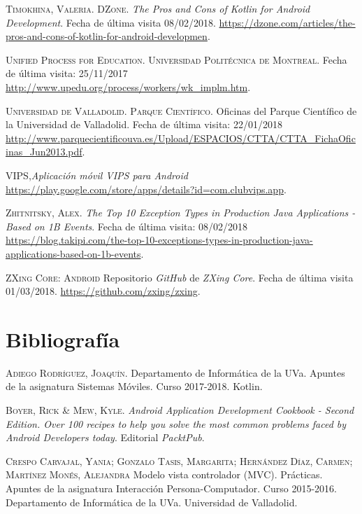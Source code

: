 \documentclass[twoside]{report}
\begin{document}
\begin{thebibliography}{a}
 \textsc{Timokhina, Valeria. DZone}. \textit{The Pros and Cons of Kotlin for Android Development}. Fecha de última visita 08/02/2018. \url{https://dzone.com/articles/the-pros-and-cons-of-kotlin-for-android-developmen}.

 \textsc{Unified Process for Education. Universidad Politécnica de Montreal}. Fecha de última visita: 25/11/2017 \url{http://www.upedu.org/process/workers/wk_implm.htm}.

 \textsc{Universidad de Valladolid. Parque Científico}. Oficinas del Parque Científico de la Universidad de Valladolid. Fecha de última visita: 22/01/2018 \url{http://www.parquecientificouva.es/Upload/ESPACIOS/CTTA/CTTA_FichaOficinas_Jun2013.pdf}.

 \textsc{VIPS},\textit{Aplicación móvil VIPS para Android} \url{https://play.google.com/store/apps/details?id=com.clubvips.app}.

 \textsc{Zhitnitsky, Alex}. \textit{The Top 10 Exception Types in Production Java Applications - Based on 1B Events}. Fecha de última visita: 08/02/2018 \url{https://blog.takipi.com/the-top-10-exceptions-types-in-production-java-applications-based-on-1b-events}.

 \textsc{ZXing Core: Android} 
Repositorio \textit{GitHub} de \textit{ZXing Core}. Fecha de última visita 01/03/2018. \url{https://github.com/zxing/zxing}.

\clearpage

\section{Bibliografía}

 \textsc{Adiego Rodríguez, Joaquín}. Departamento de Informática de la UVa. Apuntes de la asignatura Sistemas Móviles. Curso 2017-2018. Kotlin.

 \textsc{Boyer, Rick \& Mew, Kyle}. \textit{Android Application Development Cookbook - Second Edition. Over 100 recipes to help you solve the most common problems faced by Android Developers today}. Editorial \textit{PacktPub}.

 \textsc{Crespo Carvajal, Yania; Gonzalo Tasis, Margarita; Hernández Díaz, Carmen; Martínez Monés, Alejandra} Modelo vista controlador (MVC). Prácticas. Apuntes de la asignatura Interacción Persona-Computador. Curso 2015-2016. Departamento de Informática de la UVa. Universidad de Valladolid. 


\end{thebibliography}
\end{document}

